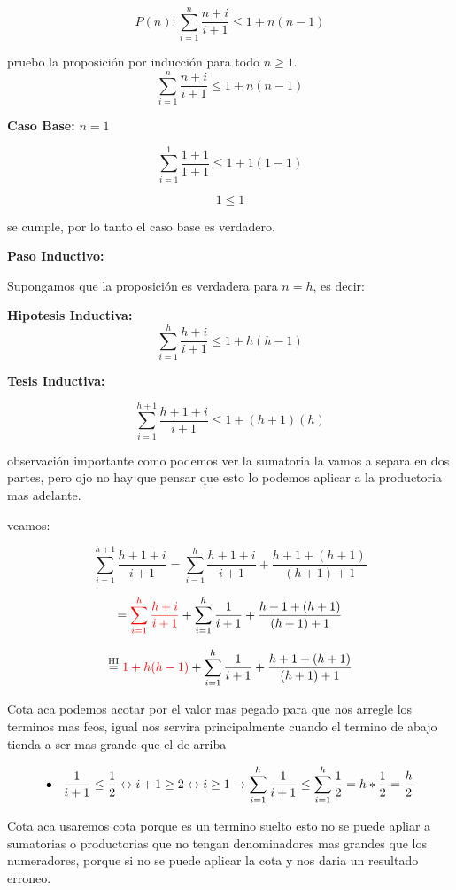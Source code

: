 \begin{ejercicio}
\[
P(n): \sum_{i=1}^{n}\frac{n+i}{i+1} \leq 1+n(n-1)
\]

pruebo la proposición por inducción para todo $n\geq1$.
\[
\sum_{i=1}^{n}\frac{n+i}{i+1} \leq 1+n(n-1)
\]

\textbf{Caso Base:} $n=1$

\[
\sum_{i=1}^{1}\frac{1+1}{1+1} \leq 1+1(1-1)
\]

\[
1 \leq 1 
\]

se cumple, por lo tanto el caso base es verdadero.

\textbf{Paso Inductivo:}

Supongamos que la proposición es verdadera para $n=h$, es decir:

\textbf{Hipotesis Inductiva:}
\[
\sum_{i=1}^{h}\frac{h+i}{i+1} \leq 1+h(h-1)
\]

\textbf{Tesis Inductiva:}

\[
\sum_{i=1}^{h+1}\frac{h+1+i}{i+1} \leq 1+(h+1)(h)
\]

\begin{nota}{observación importante}
    como podemos ver la sumatoria la vamos a separa en dos partes, pero ojo no hay que pensar que esto lo podemos aplicar a la productoria mas adelante.
\end{nota}

veamos:

\[
\sum_{i=1}^{h+1}\frac{h+1+i}{i+1} =  \sum_{i=1}^{h}\frac{h+1+i}{i+1} + \frac{h+1+(h+1)}{(h+1)+1}
\]

\[
=  \textcolor{red}{\sum_{i=1}^{h}\frac{h+i}{i+1}}+ \sum_{i=1}^{h}\frac{1}{i+1} + \frac{h+1+(h+1)}{(h+1)+1}
\]

\[
\stackrel{\text{HI}}{=} \textcolor{red}{1+h(h-1)}+ \sum_{i=1}^{h}\frac{1}{i+1} + \frac{h+1+(h+1)}{(h+1)+1}
\]
\begin{nota}{Cota}
   aca podemos acotar por el valor mas pegado para que nos arregle los terminos mas feos, igual nos servira principalmente cuando el termino de abajo tienda a ser mas grande que el de arriba 
\end{nota}

\[
\bullet \hspace{0,3 cm} \frac{1}{i+1} \leq \frac{1}{2}  \leftrightarrow i+1 \geq 2 \leftrightarrow i \geq 1 \rightarrow \sum_{i=1}^{h}\frac{1}{i+1} \leq \sum_{i=1}^{h}\frac{1}{2} = h *\frac{1}{2}=\frac{h}{2}
\]

\begin{nota}{Cota}
    aca usaremos cota porque es un termino suelto esto no se puede apliar a sumatorias o productorias que no tengan denominadores mas grandes que los numeradores, porque si no se puede aplicar la cota y nos daria un resultado erroneo.
\end{nota}


\end{ejercicio}
